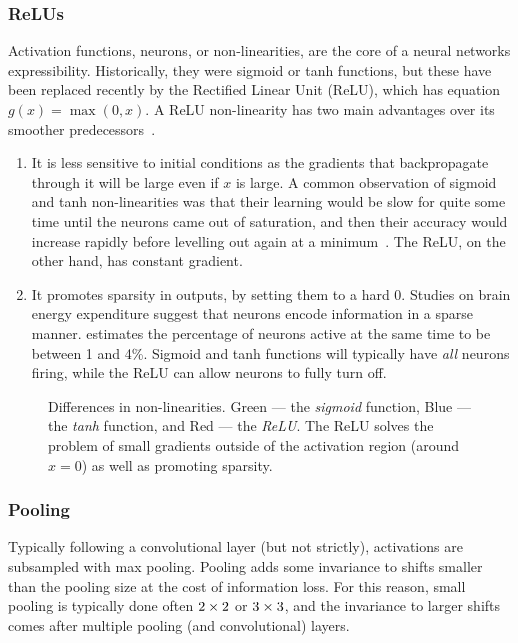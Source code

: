 \subsubsection{ReLUs}
  Activation functions, neurons, or non-linearities, are the core of a neural networks
  expressibility. Historically, they were sigmoid or tanh functions, but these
  have been replaced recently by the Rectified Linear Unit (ReLU), which has
  equation $g(x) = \max(0,x)$. A ReLU
  non-linearity has two main advantages over its smoother predecessors~\citep{%
  glorot_deep_2011, nair_rectified_2010}.
  \begin{enumerate}
  \item It is less sensitive to initial conditions as the gradients that
    backpropagate through it will be large even if $x$ is large. A common
    observation of sigmoid and tanh non-linearities was that their learning would
    be slow for quite some time until the neurons came out of saturation, and then
    their accuracy would increase rapidly before levelling out again at
    a minimum~\citep{glorot_understanding_2010}. The ReLU, on the other hand, has
    constant gradient.
  \item It promotes sparsity in outputs, by setting them to a hard 0. Studies
    on brain energy expenditure suggest that neurons encode information in
    a sparse manner. \citet{lennie_cost_2003} estimates the percentage of
    neurons active at the same time to be between 1 and 4\%. Sigmoid and tanh
    functions will typically have \emph{all} neurons firing, while 
    the ReLU can allow neurons to fully turn off.
  \end{enumerate}

  \begin{figure}
    \centering
      \caption[Differences in non-linearities]
              {Differences in non-linearities. Green --- the \emph{sigmoid} function, 
               Blue --- the \emph{tanh} function, and Red --- the \emph{ReLU}. The ReLU
               solves the problem of small gradients outside of the activation
               region (around $x=0$) as well as promoting sparsity.}\label{fig:nonlinearities}
  \end{figure}


\subsubsection{Pooling}
  Typically following a convolutional layer (but not strictly), activations are subsampled with
  max pooling. Pooling adds some invariance to shifts smaller than the pooling
  size at the cost of information loss. For this reason, small pooling is
  typically done often $2\times 2$ or $3\times 3$, and the invariance to larger shifts
  comes after multiple pooling (and convolutional) layers.
  
